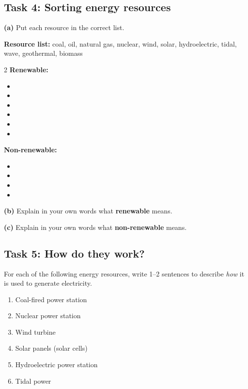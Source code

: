 \documentclass[11pt,a4paper]{article}
\begin{document}
\subsection*{Task 4: Sorting energy resources}

\textbf{(a)} Put each resource in the correct list.

\textbf{Resource list:} coal, oil, natural gas, nuclear, wind, solar, hydroelectric, tidal, wave, geothermal, biomass

\begin{multicols}{2}
\textbf{Renewable:}
\begin{itemize}
    \item 
    \item 
    \item 
    \item 
    \item 
    \item 
\end{itemize}

\columnbreak

\textbf{Non-renewable:}
\begin{itemize}
    \item 
    \item 
    \item 
    \item 
\end{itemize}
\end{multicols}

\vspace{0.5cm}

\textbf{(b)} Explain in your own words what \textbf{renewable} means.
\vspace{2cm}

\textbf{(c)} Explain in your own words what \textbf{non-renewable} means.
\vspace{2cm}
\newpage
\subsection*{Task 5: How do they work?}

For each of the following energy resources, write 1--2 sentences to describe \emph{how} it is used to generate electricity.

\begin{enumerate}[label=\arabic*)]
    \item Coal-fired power station
    \vspace{1.7cm}
    \item Nuclear power station
    \vspace{1.7cm}
    \item Wind turbine
    \vspace{1.7cm}
    \item Solar panels (solar cells)
    \vspace{1.7cm}
    \item Hydroelectric power station
    \vspace{1.7cm}
    \item Tidal power
    \vspace{1.7cm}
\end{enumerate}
\end{document}
